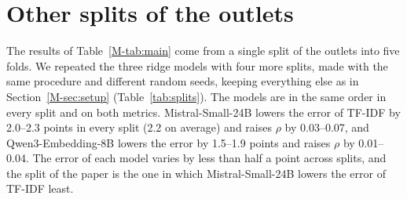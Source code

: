\documentclass[11pt,a4paper]{article}
\begin{document}
\begin{table}[h]
\centering\small
\caption{Robustness checks. Each row is a check and each column a model; the cells give the MAE per outlet and, in
parentheses, the difference from TF-IDF in the same row (negative: better than TF-IDF).}\label{tab:robust}
\end{table}

\section{Other splits of the outlets}\label{app:splits}
The results of Table~\ref{M-tab:main} come from a single split of the outlets into five folds. We repeated the three
ridge models with four more splits, made with the same procedure and different random seeds, keeping everything else
as in Section~\ref{M-sec:setup} (Table~\ref{tab:splits}). The models are in the same order in every split and on both
metrics. Mistral-Small-24B lowers the error of TF-IDF by 2.0--2.3 points in every split (2.2 on average) and raises
$\rho$ by 0.03--0.07, and Qwen3-Embedding-8B lowers the error by 1.5--1.9 points and raises $\rho$ by 0.01--0.04. The
error of each model varies by less than half a point across splits, and the split of the paper is the one in which
Mistral-Small-24B lowers the error of TF-IDF least.
\end{document}
